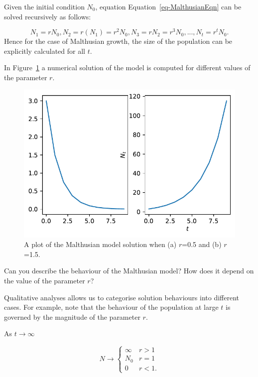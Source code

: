 \documentclass[
  letterpaper,
  DIV=11,
  numbers=noendperiod]{scrreprt}
\begin{document}
Given the initial condition \(N_0\), equation
Equation~\ref{eq-MalthusianEqn} can be solved recursively as follows:

\[
N_1=rN_0, 
N_2=r(N_1)=r^2N_0,   
N_3=rN_2=r^3N_0, ...,    
N_t=r^tN_0. 
\] Hence for the case of Malthusian growth, the size of the population
can be explicitly calculated for all \(t\).

In Figure~\ref{fig-plotmalthusian} a numerical solution of the model is
computed for different values of the parameter \(r\).

\begin{figure}

{\centering \includegraphics{MA32009-SinglePopDiscreteTimea_files/figure-pdf/fig-plotmalthusian-output-1.pdf}

}

\caption{\label{fig-plotmalthusian}A plot of the Malthusian model
solution when (a) \(r\)=0.5 and (b) \(r\)=1.5.}

\end{figure}

Can you describe the behaviour of the Malthusian model? How does it
depend on the value of the parameter \(r\)?

Qualitative analyses allows us to categorise solution behaviours into
different cases. For example, note that the behaviour of the population
at large \(t\) is governed by the magnitude of the parameter \(r\).

As \(t\rightarrow \infty\)

\[
 N \rightarrow 
\left\{
\begin{array}{ll}
\infty & r>1  \\
N_0& r=1  \\  
0 & r<1.     
\end{array} \right.
\]
\end{document}
